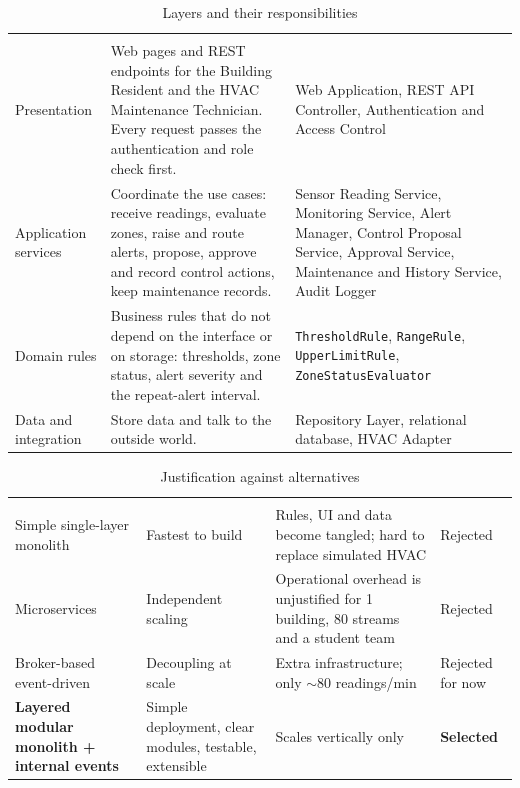 \documentclass[11pt,a4paper]{article}
\newcommand{\code}[1]{\texttt{#1}}
\begin{document}
{\small\stripe
\begin{xltabular}{\linewidth}{|L{3.1cm}|Y|L{5.3cm}|}
\caption{Layers and their responsibilities}\label{tab:layers}\\
\hline\headrow
{} &  & \\\hline
\endfirsthead
\hline\headrow
{} &  & \\\hline
\endhead
Presentation & Web pages and REST endpoints for the Building Resident and the HVAC Maintenance Technician. Every request passes the authentication and role check first. & Web Application, REST API Controller, Authentication and Access Control\\\hline
Application services & Coordinate the use cases: receive readings, evaluate zones, raise and route alerts, propose, approve and record control actions, keep maintenance records. & Sensor Reading Service, Monitoring Service, Alert Manager, Control Proposal Service, Approval Service, Maintenance and History Service, Audit Logger\\\hline
Domain rules & Business rules that do not depend on the interface or on storage: thresholds, zone status, alert severity and the repeat-alert interval. & \code{ThresholdRule}, \code{RangeRule}, \code{UpperLimitRule}, \code{ZoneStatusEvaluator}\\\hline
Data and integration & Store data and talk to the outside world. & Repository Layer, relational database, HVAC Adapter\\\hline
\end{xltabular}}

{\small\stripe
\begin{xltabular}{\linewidth}{|L{3.6cm}|L{3.3cm}|Y|L{1.9cm}|}
\caption{Justification against alternatives}\label{tab:alternatives}\\
\hline\headrow
{} &  &  & \\\hline
\endfirsthead
\hline\headrow
{} &  &  & \\\hline
\endhead
Simple single-layer monolith & Fastest to build & Rules, UI and data become tangled; hard to replace simulated HVAC & Rejected\\\hline
Microservices & Independent scaling & Operational overhead is unjustified for 1 building, 80 streams and a student team & Rejected\\\hline
Broker-based event-driven & Decoupling at scale & Extra infrastructure; only $\sim$80 readings/min & Rejected for now\\\hline
\textbf{Layered modular monolith + internal events} & Simple deployment, clear modules, testable, extensible & Scales vertically only & \textbf{Selected}\\\hline
\end{xltabular}}
\end{document}

